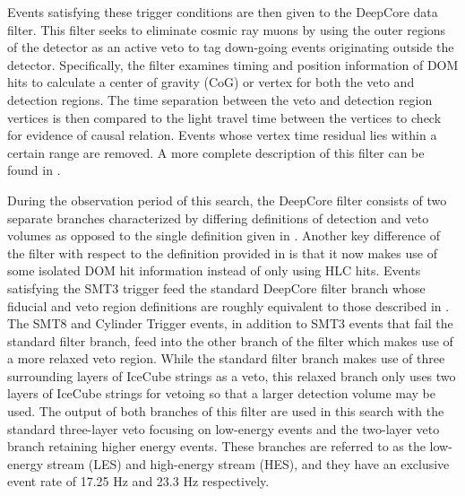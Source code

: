 \documentclass[manuscript]{aastex}
\begin{document}
Events satisfying these trigger conditions are then given to the DeepCore data filter. This filter seeks to eliminate cosmic ray muons by using the outer regions of the detector as an active veto to tag down-going events originating outside the detector. Specifically, the filter examines timing and position information of DOM hits to calculate a center of gravity (CoG) or vertex for both the veto and detection regions. The time separation between the veto and detection region vertices is then compared to the light travel time between the vertices to check for evidence of causal relation. Events whose vertex time residual lies within a certain range are removed. A more complete description of this filter can be found in \cite{2012APh....35..615A}.

During the observation period of this search, the DeepCore filter consists of two separate branches characterized by differing definitions of detection and veto volumes as opposed to the single definition given in \cite{2012APh....35..615A}. Another key difference of the filter with respect to the definition provided in \cite{2012APh....35..615A} is that it now makes use of some isolated DOM hit information instead of only using HLC hits. Events satisfying the SMT3 trigger feed the standard DeepCore filter branch whose fiducial and veto region definitions are roughly equivalent to those described in \cite{2012APh....35..615A}. The SMT8 and Cylinder Trigger events, in addition to SMT3 events that fail the standard filter branch, feed into the other branch of the filter which makes use of a more relaxed veto region. While the standard filter branch makes use of three surrounding layers of IceCube strings as a veto, this relaxed branch only uses two layers of IceCube strings for vetoing so that a larger detection volume may be used. The output of both branches of this filter are used in this search with the standard three-layer veto focusing on low-energy events and the two-layer veto branch retaining higher energy events. These branches are referred to as the low-energy stream (LES) and high-energy stream (HES), and they have an exclusive event rate of 17.25 Hz and 23.3 Hz respectively.
\end{document}
